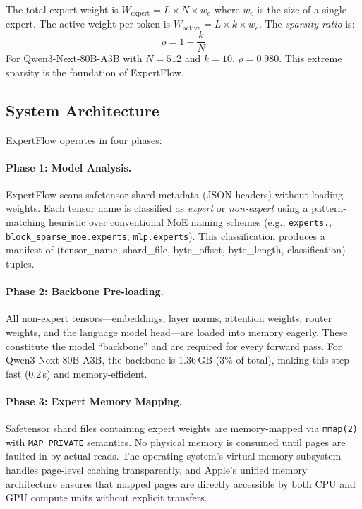 \documentclass[11pt,a4paper]{article}
\begin{document}
The total expert weight is $W_{\text{expert}} = L \times N \times w_e$ where
$w_e$ is the size of a single expert. The active weight per token is
$W_{\text{active}} = L \times k \times w_e$. The \emph{sparsity ratio} is:
\begin{equation}
  \rho = 1 - \frac{k}{N}
\end{equation}
For Qwen3-Next-80B-A3B with $N=512$ and $k=10$, $\rho = 0.980$. This extreme
sparsity is the foundation of ExpertFlow.

\subsection{System Architecture}
\label{sec:method:arch}

ExpertFlow operates in four phases:

\paragraph{Phase 1: Model Analysis.}
ExpertFlow scans safetensor shard metadata (JSON headers) without loading
weights. Each tensor name is classified as \emph{expert} or
\emph{non-expert} using a pattern-matching heuristic over conventional MoE
naming schemes (e.g., \texttt{experts.}, \texttt{block\_sparse\_moe.experts},
\texttt{mlp.experts}). This classification produces a manifest of
(tensor\_name, shard\_file, byte\_offset, byte\_length, classification)
tuples.

\paragraph{Phase 2: Backbone Pre-loading.}
All non-expert tensors---embeddings, layer norms, attention weights, router
weights, and the language model head---are loaded into memory eagerly. These
constitute the model ``backbone'' and are required for every forward pass.
For Qwen3-Next-80B-A3B, the backbone is 1.36\,GB (3\% of total), making this
step fast (0.2\,s) and memory-efficient.

\paragraph{Phase 3: Expert Memory Mapping.}
Safetensor shard files containing expert weights are memory-mapped via
\texttt{mmap(2)} with \texttt{MAP\_PRIVATE} semantics. No physical memory is
consumed until pages are faulted in by actual reads. The operating system's
virtual memory subsystem handles page-level caching transparently, and
Apple's unified memory architecture ensures that mapped pages are directly
accessible by both CPU and GPU compute units without explicit transfers.
\end{document}
